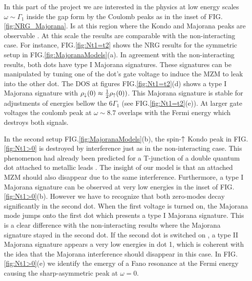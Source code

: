 \documentclass[showpacs,aps,prb,reprint,superscriptaddress]{revtex4-1}
\begin{document}
    In this part of the project we are interested in the physics at low energy scales $\omega \sim \Gamma_1 $ inside the gap form by the Coulomb peaks as in the inset of FIG.\ref{fig:NRG_Majorana}. Is at this region where the Kondo and Majorana peaks are observable . At this scale the results are comparable with the non-interacting case.   For instance, FIG.\ref{fig:Nt1=t2} shows the NRG results for the symmetric setup in FIG.\ref{fig:MajoranaModels}(a). In agreement with the non-interacting results, both dots have type I Majorana signatures. These signatures can be manipulated by tuning one of the dot's gate voltage to induce the MZM to leak into the other dot. The DOS at figures FIG.\ref{fig:Nt1=t2}(d) shows a type I Majorana signature with $\rho_\downarrow(0) \approx \frac{1}{2}\rho_\uparrow(0))$. This Majorana signature is stable for adjustments of energies bellow the $6\Gamma_1$ (see FIG.\ref{fig:Nt1=t2}(e)). At larger gate voltages the coulomb peak at $\omega \sim 8.7$ overlaps with the Fermi energy which destroys both signals.


    In the second setup FIG.\ref{fig:MajoranaModels}(b), the spin-$\uparrow$ Kondo peak in  FIG.\ref{fig:Nt1>0} is destroyed by interference just as in the non-interacting case. This phenomenon had already been predicted for a T-junction of a double quantum dot attached to metallic leads \cite{dias_da_silva_transmission_2008}. The insight of our model is that an attached MZM should also disappear due to the same interference. Furthermore, a type I Majorana signature can be observed at very low energies in the inset of FIG.\ref{fig:Nt1>0}(b). However we have to recognize that both zero-modes decay significantly in the second dot. When the first voltage is turned on, the Majorana mode jumps onto the first dot which presents a type I Majorana signature. This is a clear difference with the non-interacting results where the Majorana signature stayed in the second dot.  If the second dot is switched on , a type II Majorana signature appears a very low energies in dot 1, which is coherent with the idea that the Majorana interference should disappear in this case. In FIG.\ref{fig:Nt1>0}(e) we identify the emergy of a Fano resonance at the Fermi energy causing the sharp-asymmetric peak at $\omega = 0$.  
    
\end{document}
